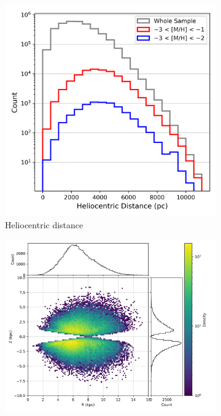 \documentclass[a4paper,12pt]{article}
\begin{document}
\begin{figure}
  \centering
  \begin{subfigure}[b]{0.32\textwidth}
    \includegraphics[width=\textwidth]{../figures/distance_histogram.png}
    \caption{Heliocentric distance}
    \label{fig:dist_hist}
  \end{subfigure}\hfill
  \begin{subfigure}[b]{0.32\textwidth}
    \includegraphics[width=\textwidth]{../figures/ZR_distribution.png}

\end{subfigure}
\end{figure}
\end{document}
